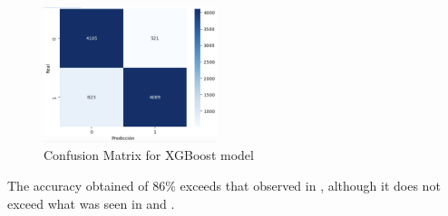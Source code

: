 \begin{figure}[H]
    \centering
    \includegraphics[width=0.45\textwidth]{images/confusion_matrix_xgboots.png} 
    \caption{Confusion Matrix for XGBoost model}
    \label{fig:confusion_matrix_xgboost}
\end{figure}

The accuracy obtained of 86\% exceeds that observed in \cite{toktarova2023hate}, although it does not exceed what was seen in \cite{bonetti2023comparison} and \cite{fieri2023offensive}.